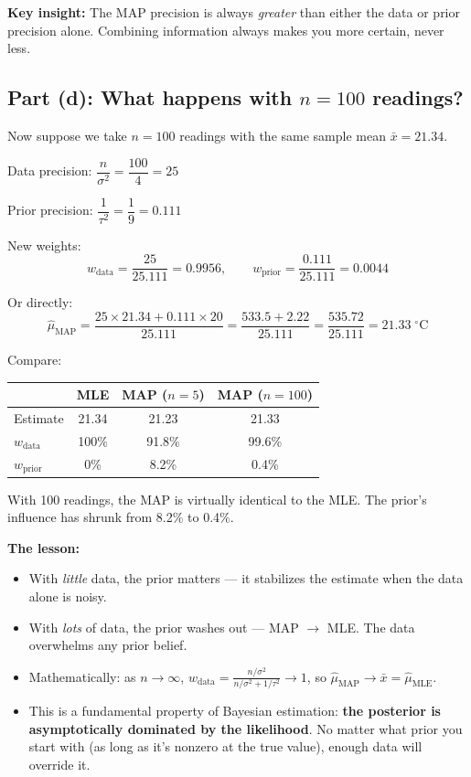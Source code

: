 \documentclass[11pt]{article}
\begin{document}
\textbf{Key insight:} The MAP precision is always \textit{greater} than either the data or prior precision alone. Combining information always makes you more certain, never less.


\subsection*{Part (d): What happens with $n = 100$ readings?}

Now suppose we take $n = 100$ readings with the same sample mean $\bar{x} = 21.34$.

Data precision: $\dfrac{n}{\sigma^2} = \dfrac{100}{4} = 25$

\medskip
Prior precision: $\dfrac{1}{\tau^2} = \dfrac{1}{9} = 0.111$

\medskip
New weights:
\[
  w_{\text{data}} = \frac{25}{25.111} = 0.9956, \qquad w_{\text{prior}} = \frac{0.111}{25.111} = 0.0044
\]

Or directly:
\[
  \hat\mu_{\text{MAP}} = \frac{25 \times 21.34 + 0.111 \times 20}{25.111} = \frac{533.5 + 2.22}{25.111} = \frac{535.72}{25.111} = 21.33\;{}^\circ\text{C}
\]

Compare:
\begin{center}
\renewcommand{\arraystretch}{1.4}
\begin{tabular}{lccc}
\hline
& \textbf{MLE} & \textbf{MAP ($n=5$)} & \textbf{MAP ($n=100$)} \\
\hline
Estimate & 21.34 & 21.23 & 21.33 \\
$w_{\text{data}}$ & 100\% & 91.8\% & 99.6\% \\
$w_{\text{prior}}$ & 0\% & 8.2\% & 0.4\% \\
\hline
\end{tabular}
\end{center}

With 100 readings, the MAP is virtually identical to the MLE. The prior's influence has shrunk from 8.2\% to 0.4\%.

\bigskip
\textbf{The lesson:}
\begin{itemize}
  \item With \textit{little} data, the prior matters --- it stabilizes the estimate when the data alone is noisy.
  \item With \textit{lots} of data, the prior washes out --- MAP $\to$ MLE. The data overwhelms any prior belief.
  \item Mathematically: as $n \to \infty$, $w_{\text{data}} = \frac{n/\sigma^2}{n/\sigma^2 + 1/\tau^2} \to 1$, so $\hat\mu_{\text{MAP}} \to \bar{x} = \hat\mu_{\text{MLE}}$.
  \item This is a fundamental property of Bayesian estimation: \textbf{the posterior is asymptotically dominated by the likelihood}. No matter what prior you start with (as long as it's nonzero at the true value), enough data will override it.
\end{itemize}
\end{document}
